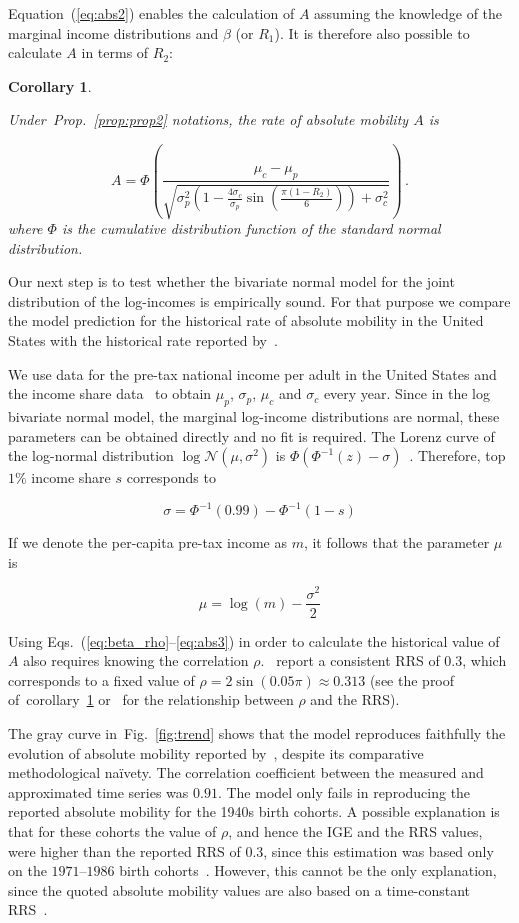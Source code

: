 \documentclass[12pt]{article}
\newtheorem{corollary}[theorem]{Corollary}
\newcommand{\elabel}[1]{\label{eq:#1}}
\newcommand{\Eref}[1]{Equation~(\ref{eq:#1})}
\newcommand{\pref}[1]{Prop.~\ref{prop:#1}}
\newcommand{\clabel}[1]{\label{coro:#1}}
\newcommand{\creflong}[1]{corollary~\ref{coro:#1}}
\newcommand{\fref}[1]{Fig.~\ref{fig:#1}}
\newcommand{\be}{\begin{equation}}
\newcommand{\ee}{\end{equation}}
\numberwithin{equation}{section}
\begin{document}
\Eref{abs2} enables the calculation of $A$ assuming the knowledge of the marginal income distributions and $\beta$ (or $R_1$). It is therefore also possible to calculate $A$ in terms of $R_2$:

\begin{corollary}
\clabel{coro1}

Under~\pref{prop2} notations, the rate of absolute mobility $A$ is

\be
A = \Phi\left(\frac{\mu_c - \mu_p}{\sqrt{\sigma_p^2\left(1 - \frac{4\sigma_c}{\sigma_p}\sin{\left(\frac{\pi\left(1-R_2\right)}{6}\right)}\right) + \sigma_c^2}}\right) \,.
\elabel{abs3}
\ee
where $\Phi$ is the cumulative distribution function of the standard normal distribution.
\end{corollary}

Our next step is to test whether the bivariate normal model for the joint distribution of the log-incomes is empirically sound. For that purpose we compare the model prediction for the historical rate of absolute mobility in the United States with the historical rate reported by~\citet{chetty2017fading}.

We use data for the pre-tax national income per adult in the United States and the income share data~\citep{WID2017} to obtain $\mu_p$, $\sigma_p$, $\mu_c$ and $\sigma_c$ every year. Since in the log bivariate normal model, the marginal log-income distributions are normal, these parameters can be obtained directly and no fit is required. The Lorenz curve of the log-normal distribution $\log{\mathcal{N}}\left(\mu,\sigma^2\right)$ is $\Phi\left(\Phi^{-1}\left(z\right)-\sigma\right)$~\citep{cowell2011measuring}. Therefore, top $1\%$ income share $s$ corresponds to

\be
\sigma = \Phi^{-1}\left(0.99\right) - \Phi^{-1}\left(1-s\right)
\ee

If we denote the per-capita pre-tax income as $m$, it follows that the parameter $\mu$ is

\be
\mu = \log{\left(m\right)} - \frac{\sigma^2}{2}
\ee

Using Eqs.~(\ref{eq:beta_rho}--\ref{eq:abs3}) in order to calculate the historical value of $A$ also requires knowing the correlation $\rho$.~\citet{chetty2014land} report a consistent RRS of $0.3$, which corresponds to a fixed value of $\rho=2\sin{\left(0.05\pi\right)}\approx0.313$ (see the proof of~\creflong{coro1} or~\citet{trivedi2007copula} for the relationship between $\rho$ and the RRS).

The gray curve in~\fref{trend} shows that the model reproduces faithfully the evolution of absolute mobility reported by~\citet{chetty2017fading}, despite its comparative methodological na\"{i}vety. The correlation coefficient between the measured and approximated time series was $0.91$. The model only fails in reproducing the reported absolute mobility for the 1940s birth cohorts. A possible explanation is that for these cohorts the value of $\rho$, and hence the IGE and the RRS values, were higher than the reported RRS of $0.3$, since this estimation was based only on the $1971$--$1986$ birth cohorts~\citep{chetty2014land}. However, this cannot be the only explanation, since the quoted absolute mobility values are also based on a time-constant RRS~\citep{chetty2017fading}.
\end{document}
